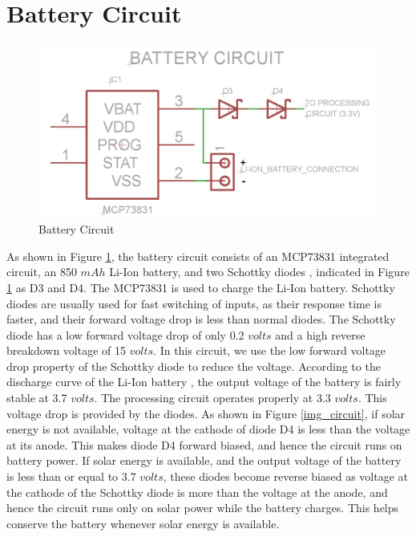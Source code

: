 \section{Battery Circuit}

\begin{figure}[htbp]
\centering
\includegraphics[width=\columnwidth]{battery_ckt.PNG}
\caption{Battery Circuit}
\label{img_batteryCircuit}
\end{figure}

As shown in Figure \ref{img_batteryCircuit}, the battery circuit consists of an MCP73831 integrated circuit, an 850 $mAh$ Li-Ion battery, and two Schottky diodes \cite{bib_diode}, indicated in Figure \ref{img_batteryCircuit} as D3 and D4. The MCP73831 is used to charge the Li-Ion battery. Schottky diodes are usually used for fast switching of inputs, as their response time is faster, and their forward voltage drop is less than normal diodes. The Schottky diode has a low forward voltage drop of only 0.2 $volts$ and a high reverse breakdown voltage of 15 $volts$. In this circuit, we use the low forward voltage drop property of the Schottky diode to reduce the voltage. According to the discharge curve of the Li-Ion battery \cite{bib_battery}, the output voltage of the battery is fairly stable at 3.7 $volts$. The processing circuit operates properly at 3.3 $volts$. This voltage drop is provided by the diodes. As shown in Figure \ref{img_circuit}, if solar energy is not available, voltage at the cathode of diode D4 is less than the voltage at its anode. This makes diode D4 forward biased, and hence the circuit runs on battery power. If solar energy is available, and the output voltage of the battery is less than or equal to 3.7 $volts$, these diodes become reverse biased as voltage at the cathode of the Schottky diode is more than the voltage at the anode, and hence the circuit runs only on solar power while the battery charges. This helps conserve the battery whenever solar energy is available.

